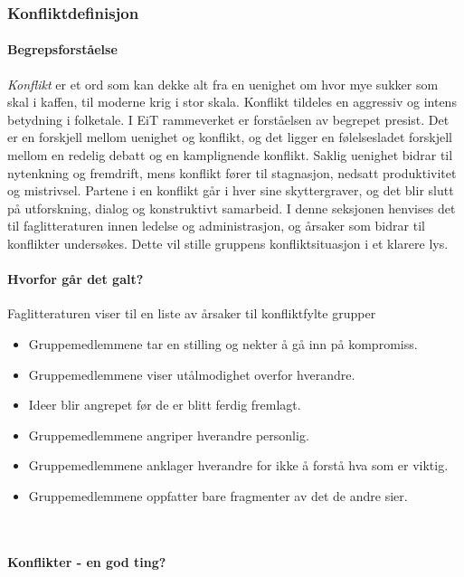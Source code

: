 \subsubsection{Konfliktdefinisjon}

\paragraph{Begrepsforståelse}

\emph{Konflikt} er et ord som kan dekke alt fra en uenighet om hvor mye sukker som skal i kaffen, til moderne krig i stor skala. 
Konflikt tildeles en aggressiv og intens betydning i folketale.
I EiT rammeverket er forståelsen av begrepet presist.
Det er en forskjell mellom uenighet og konflikt, og det ligger en følelsesladet forskjell mellom en redelig debatt og en kamplignende konflikt.
Saklig uenighet bidrar til nytenkning og fremdrift, mens konflikt fører til stagnasjon, nedsatt produktivitet og mistrivsel\cite{ledernytt}.
Partene i en konflikt går i hver sine skyttergraver, og det blir slutt på utforskning, dialog og konstruktivt samarbeid.
I denne seksjonen henvises det til faglitteraturen innen ledelse og administrasjon, og årsaker som bidrar til konflikter undersøkes.
Dette vil stille gruppens konfliktsituasjon i et klarere lys. 
\\
\paragraph{Hvorfor går det galt?}

Faglitteraturen viser til en liste av årsaker til konfliktfylte grupper\cite[p.~253]{orgorg}
\begin{itemize}
  \item Gruppemedlemmene tar en stilling og nekter å gå inn på kompromiss.
  \item Gruppemedlemmene viser utålmodighet overfor hverandre.  
  \item Ideer blir angrepet før de er blitt ferdig fremlagt.
  \item Gruppemedlemmene angriper hverandre personlig.
  \item Gruppemedlemmene anklager hverandre for ikke å forstå hva som er viktig.
  \item Gruppemedlemmene oppfatter bare fragmenter av det de andre sier.  
\end{itemize}
\\
\paragraph{Konflikter - en god ting?}

